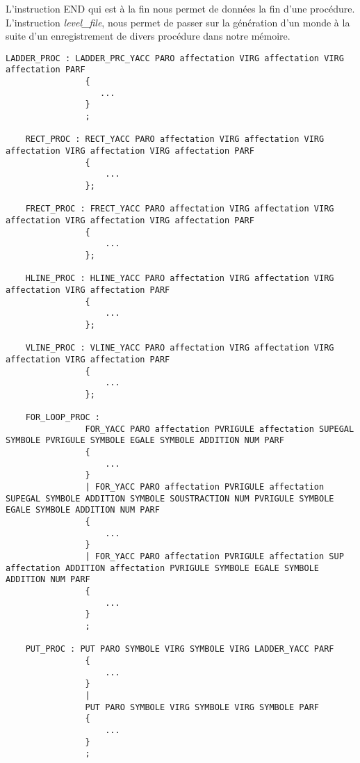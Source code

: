 L'instruction END qui est à la fin nous permet de données la fin d'une procédure.
L'instruction \textit{level\_file}, nous permet de passer sur la génération d'un monde à la suite d'un enregistrement de divers procédure dans notre mémoire.

\lstset{style=mystyle}
\begin{lstlisting}[caption=Régle de grammaire pour les différentes procédures]
LADDER_PROC : LADDER_PRC_YACC PARO affectation VIRG affectation VIRG affectation PARF 
                {
                   ...
                }
                ;

    RECT_PROC : RECT_YACC PARO affectation VIRG affectation VIRG affectation VIRG affectation VIRG affectation PARF 
                {
                    ...
                };

    FRECT_PROC : FRECT_YACC PARO affectation VIRG affectation VIRG affectation VIRG affectation VIRG affectation PARF 
                {
                    ...
                };

    HLINE_PROC : HLINE_YACC PARO affectation VIRG affectation VIRG affectation VIRG affectation PARF 
                {
                    ...
                };

    VLINE_PROC : VLINE_YACC PARO affectation VIRG affectation VIRG affectation VIRG affectation PARF 
                {
                    ...
                };

    FOR_LOOP_PROC : 
                FOR_YACC PARO affectation PVRIGULE affectation SUPEGAL SYMBOLE PVRIGULE SYMBOLE EGALE SYMBOLE ADDITION NUM PARF
                {
                    ...
                }
                | FOR_YACC PARO affectation PVRIGULE affectation SUPEGAL SYMBOLE ADDITION SYMBOLE SOUSTRACTION NUM PVRIGULE SYMBOLE EGALE SYMBOLE ADDITION NUM PARF
                {
                    ...
                }
                | FOR_YACC PARO affectation PVRIGULE affectation SUP affectation ADDITION affectation PVRIGULE SYMBOLE EGALE SYMBOLE ADDITION NUM PARF
                {
                    ...
                }
                ;

    PUT_PROC : PUT PARO SYMBOLE VIRG SYMBOLE VIRG LADDER_YACC PARF  
                {
                    ...
                }
                |
                PUT PARO SYMBOLE VIRG SYMBOLE VIRG SYMBOLE PARF  
                {
                    ...
                }
                ;

\end{lstlisting}


